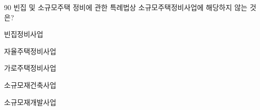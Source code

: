 \begin{question}{90}
빈집 및 소규모주택 정비에 관한 특례법상 소규모주택정비사업에 해당하지 않는 것은?
\begin{choices}
  \item 빈집정비사업
  \item 자율주택정비사업
  \item 가로주택정비사업
  \item 소규모재건축사업
  \item 소규모재개발사업
\end{choices}
\end{question}
